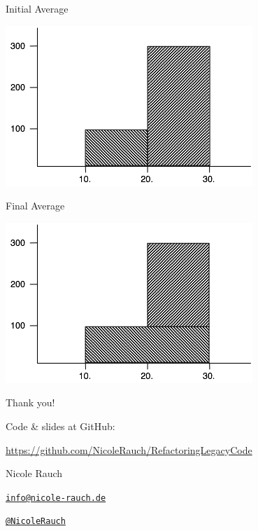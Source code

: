 \begin{frame}[fragile]{Initial Average}
\begin{center}
\includegraphics[width=.85 \paperwidth]{../workshopMaterial/initialAverage.jpg}
\end{center}
\end{frame}

\begin{frame}[fragile]{Final Average}
\begin{center}
\includegraphics[width=.85 \paperwidth]{../workshopMaterial/finalAverage.jpg}
\end{center}
\end{frame}


{
\begin{frame}{Thank you!}

        Code \& slides at GitHub:
        \begin{center}
                \url{https://github.com/NicoleRauch/RefactoringLegacyCode}
        \end{center}

        \begin{block}{Nicole Rauch}
        \begin{description}[Twitterxx]
                \item[E-Mail]  \href{mailto:info@nicole-rauch.de}{\texttt{info@nicole-rauch.de}}
                \item[Twitter] \href{http://twitter.com/NicoleRauch}{\texttt{@NicoleRauch}}
        \end{description}
        \end{block}
\end{frame}
}
